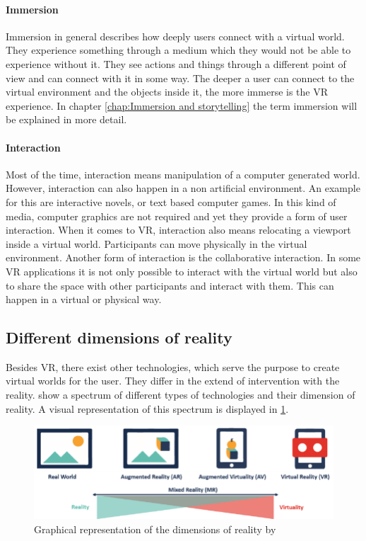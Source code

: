 \paragraph{Immersion} Immersion in general describes how deeply users connect with a virtual world. They experience something through a medium which they would not be able to experience without it. They see actions and things through a different point of view and can connect with it in some way. The deeper a user can connect to the virtual environment and the objects inside it, the more immerse is the VR experience. In chapter \ref{chap:Immersion and storytelling} the term immersion will be explained in more detail.

\paragraph{Interaction} Most of the time, interaction means manipulation of a computer generated world. However, interaction can also happen in a non artificial environment. An example for this are interactive novels, or text based computer games. In this kind of media, computer graphics are not required and yet they provide a form of user interaction. When it comes to VR, interaction also means relocating a viewport inside a virtual world. Participants can move physically in the virtual environment. Another form of interaction is the collaborative interaction. In some VR applications it is not only possible to interact with the virtual world but also to share the space with other participants and interact with them. This can happen in a virtual or physical way.
\subsection{Different dimensions of reality}
Besides VR, there exist other technologies, which serve the purpose to create virtual worlds for the user. They differ in the extend of intervention with the reality. \cite{Tham.2018} show a spectrum of different types of technologies and their dimension of reality. A visual representation of this spectrum is displayed in \ref{fig:spectrum}.\\
\begin{figure}[h!]
  \includegraphics[width=14cm]{kapitel/spectrum-of-reality.png}
  \centering
  \caption{Graphical representation of the dimensions of reality by 	  \cite{Lovreglio.2018}}
  \label{fig:spectrum}
\end{figure}

